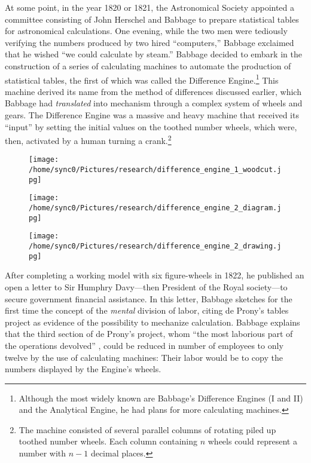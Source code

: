 \documentclass[version=last,draft=false,paper=A4,portrait,twoside=true,twocolumn=false,headinclude=false,footinclude=false,mpinclude=true,fontsize=12,BCOR=20mm,DIV=calc,pagesize=auto,open=right,chapterprefix=true,numbers=autoendperiod,headsepline=false,headings=twolinechapter,parskip=false]{scrbook}
\begin{document}
At some point, in the year 1820 or 1821, the Astronomical Society appointed
a committee consisting of John Herschel and Babbage to prepare statistical
tables for astronomical calculations. One evening, while the two men were
tediously verifying the numbers produced by two hired ``computers,''
Babbage exclaimed that he wished ``we could calculate by steam.'' Babbage
decided to embark in the construction of a series of calculating machines
to automate the production of statistical tables, the first of which was
called the Difference Engine.\footnote{Although the most widely known are Babbage's Difference Engines (I
and II) and the Analytical Engine, he had plans for more calculating
machines.} This machine derived its name from the
method of differences discussed earlier, which Babbage had \emph{translated} into
mechanism through a complex system of wheels and gears. The Difference
Engine was a massive and heavy machine that received its ``input'' by
setting the initial values on the toothed number wheels, which were, then,
activated by a human turning a crank.\footnote{The machine consisted of several parallel columns of rotating piled
up toothed number wheels. Each column containing \(n\) wheels could represent
a number with  \(n - 1\) decimal places.}

\begin{figure}[htbp]
\centering
\texttt{[image: /home/sync0/Pictures/research/difference\_engine\_1\_woodcut.jpg]}
\end{figure}

\begin{figure}[htbp]
\centering
\texttt{[image: /home/sync0/Pictures/research/difference\_engine\_2\_diagram.jpg]}
\end{figure}

\begin{figure}[htbp]
\centering
\texttt{[image: /home/sync0/Pictures/research/difference\_engine\_2\_drawing.jpg]}
\end{figure}


After completing a working model with six figure-wheels in 1822, he
published an open a letter to Sir Humphry Davy---then President of the
Royal society---to secure government financial assistance. In this letter,
Babbage sketches for the first time the concept of the \emph{mental} division of
labor, citing de Prony's tables project as evidence of the possibility to
mechanize calculation. Babbage explains that the third section of de
Prony's project, whom ``the most laborious part of the operations
devolved'' \autocite[214]{babbage1822}, could be reduced in number of
employees to only twelve by the use of calculating machines: Their labor
would be to copy the numbers displayed by the Engine's wheels.
\end{document}

